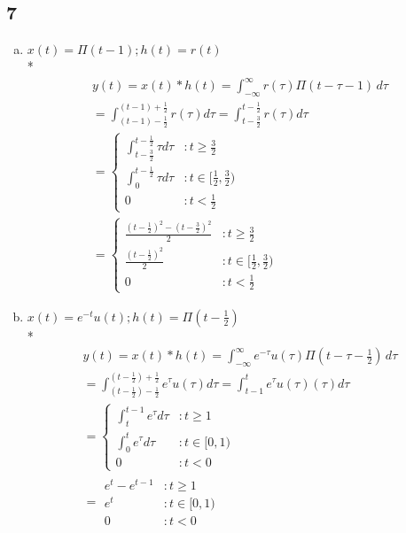 \documentclass[10pt, letterpaper]{article}
\begin{document}
\subsection*{7}

\begin{enumerate}[a.]
\item
$x(t) = \Pi ( t - 1); h(t) = r(t)$ \\*
\begin{align*}
	y(t) = x(t) * h(t) = \int_{-\infty}^{\infty} r(\tau) \Pi (t - \tau - 1) \, d\tau \\
	= \int_{(t - 1) - \frac{1}{2}}^{(t - 1) + \frac{1}{2}}r(\tau) d\tau
	= \int_{t - \frac{3}{2}}^{t - \frac{1}{2}}r(\tau) d\tau \\
           = \left\{
  		\begin{array}{lr}
		    \int_{t - \frac{3}{2}}^{t - \frac{1}{2}}\tau d\tau & : t\geq \frac{3}{2} \\
		    \int_{0}^{t - \frac{1}{2}}\tau d\tau & : t \in [\frac{1}{2}, \frac{3}{2})\\
	              0 & : t < \frac{1}{2}
		  \end{array}
	\right. \\
	=
	\boxed{
          	\left\{
  		\begin{array}{lr}
		    \frac{(t - \frac{1}{2})^2 - (t - \frac{3}{2})^2}{2} & : t \geq \frac{3}{2} \\
		    \frac{(t - \frac{1}{2})^2}{2} & : t \in [\frac{1}{2}, \frac{3}{2})\\
	              0 & : t < \frac{1}{2}
		  \end{array}
	\right.
	}
\end{align*}

\item
$x(t) = e^{-t}u(t); h(t) = \Pi (t - \frac{1}{2})$\\*
\begin{align*}
	y(t) = x(t) * h(t) = \int_{-\infty}^{\infty} e^{-\tau}u(\tau) \Pi (t - \tau - \frac{1}{2}) \, d\tau \\
	= \int_{(t - \frac{1}{2}) - \frac{1}{2}}^{(t - \frac{1}{2}) + \frac{1}{2}}e^\tau u(\tau) d\tau
	= \int_{t - 1}^{t}e^\tau u(\tau)(\tau) d\tau \\
           = \left\{
  		\begin{array}{lr}
		    \int_{t}^{t - 1}e^\tau  d\tau & : t\geq 1 \\
		    \int_{0}^{t}e^\tau d\tau & : t \in [0, 1)\\
	              0 & : t < 0
		  \end{array}
	\right. \\	
	=
	\boxed{
	\begin{array}{lr}
		    e^t - e^{t - 1} & : t\geq 1 \\
		    e^t & : t \in [0, 1)\\
	              0 & : t < 0
	 \end{array}
	}
\end{align*}


\end{enumerate}
\end{document}
